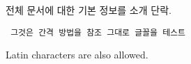 \documentclass{article}
\begin{document}
\begin{CJK}{UTF8}{}
 전체 문서에 대한 기본 정보를 소개 단락.

 \begin{verbatim}
 그것은 간격 방법을 참조 그대로 글꼴을 테스트
 \end{verbatim}
\end{CJK}

Latin characters are also allowed.
\end{document}
